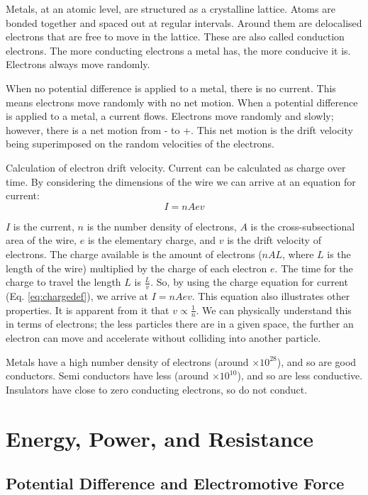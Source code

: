Metals, at an atomic level, are structured as a crystalline lattice. Atoms are bonded together and spaced out at regular intervals. Around them are delocalised electrons that are free to move in the lattice. These are also called conduction electrons. The more conducting electrons a metal has, the more conducive it is. Electrons always move randomly.

When no potential difference is applied to a metal, there is no current. This means electrons move randomly with no net motion. When a potential difference is applied to a metal, a current flows. Electrons move randomly and slowly; however, there is a net motion from - to +. This net motion is the drift velocity being superimposed on the random velocities of the electrons.

\begin{definition}
	Calculation of electron drift velocity. Current can be calculated as charge over time. By considering the dimensions of the wire we can arrive at an equation for current:
\begin{equation}
	I=nAev
	\label{eq:driftv}
\end{equation}
\end{definition}
$I$ is the current, $n$ is the number density of electrons, $A$ is the cross-subsectional area of the wire, $e$ is the elementary charge, and $v$ is the drift velocity of electrons. The charge available is the amount of electrons ($nAL$, where $L$ is the length of the wire) multiplied by the charge of each electron $e$. The time for the charge to travel the length $L$ is $\frac{L}{v}$. So, by using the charge equation for current (Eq. \ref{eq:chargedef}), we arrive at $I=nAev$. This equation also illustrates other properties. It is apparent from it that $v \propto\frac{1}{n}$. We can physically understand this in terms of electrons; the less particles there are in a given space, the further an electron can move and accelerate without colliding into another particle.

Metals have a high number density of electrons (around $\times 10^{28}$), and so are good conductors. Semi conductors have less (around $\times 10^{10}$), and so are less conductive. Insulators have close to zero conducting electrons, so do not conduct.

\section{Energy, Power, and Resistance}

\subsection{Potential Difference and Electromotive Force}


